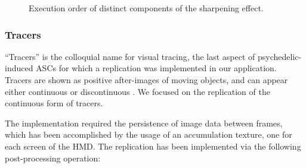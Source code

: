\begin{figure}[H]
    \centering
    \ifgraphics
    \fi
    \caption{Execution order of distinct components of the sharpening effect.}\label{fig:sharpening}
\end{figure}

\subsubsection{Tracers}

``Tracers'' is the colloquial name for visual tracing, the last aspect of psychedelic-induced \acp{ASC} for which a replication was implemented in our application. Tracers are shown as positive after-images of moving objects, and can appear either continuous or discontinuous \autocites{hartman1963effect}{diaz2010sacred}{anderson1972trifluoperazine}{kleinman1977comparison}. We focused on the replication of the continuous form of tracers.

The implementation required the persistence of image data between frames, which has been accomplished by the usage of an accumulation texture, one for each screen of the \ac{HMD}. The replication has been implemented via the following post-processing operation:

